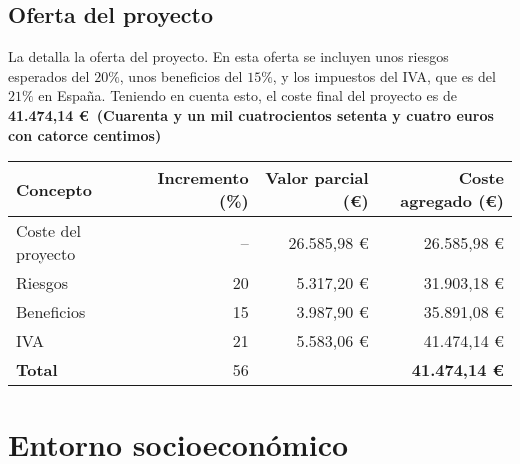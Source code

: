 \subsection{Oferta del proyecto}\label{subsec:offer}

La  detalla la oferta del proyecto. En esta oferta se
incluyen unos riesgos esperados del $20 \%$, unos beneficios del $15 \%$, y los
impuestos del IVA, que es del $21 \%$ en España. Teniendo en cuenta esto, el
coste final del proyecto es de \textbf{41.474,14 \euro~(Cuarenta y un mil
cuatrocientos setenta y cuatro euros con catorce centimos)}

\begin{table}[htb]
    {
      \begin{tabular}{lrrr}
        \toprule
        \textbf{Concepto} & \textbf{Incremento (\%)} & \textbf{Valor parcial (\euro)} & \textbf{Coste agregado (\euro)} \\
        \midrule
        Coste del proyecto & -- & 26.585,98 \euro & 26.585,98 \euro \\
        Riesgos            & 20 &  5.317,20 \euro & 31.903,18 \euro \\
        Beneficios         & 15 &  3.987,90 \euro & 35.891,08 \euro \\
        IVA                & 21 &  5.583,06 \euro & 41.474,14 \euro \\
        \midrule
        \textbf{Total}     & 56 &                 & \textbf{41.474,14 \euro} \\
        \bottomrule
      \end{tabular}
    }
\end{table}

\section{Entorno socioeconómico}
